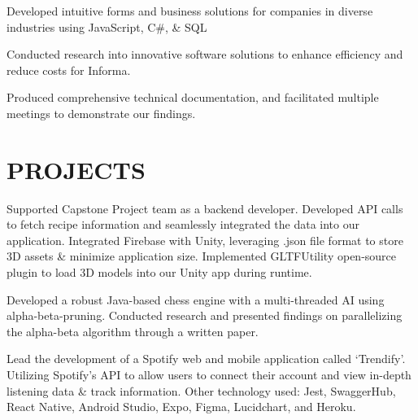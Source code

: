 \documentclass[]{deedy-resume-openfont}
\begin{document}
\begin{tightemize}
\item Developed intuitive forms and business solutions for companies in diverse industries using JavaScript, C\#, \& SQL 
\item Conducted research into innovative software solutions to enhance efficiency and reduce costs for Informa. 
\item Produced comprehensive technical documentation, and facilitated multiple meetings to demonstrate our findings.
\end{tightemize}


\section{PROJECTS}
\begin{tightemize}
\item Supported Capstone Project team as a backend developer. Developed API calls to fetch recipe information and seamlessly integrated the data into our application. Integrated Firebase with Unity, leveraging .json file format to store  3D assets \& minimize application size. Implemented  GLTFUtility open-source plugin to load 3D models into our Unity app during runtime.
\end{tightemize}
\sectionsep

\begin{tightemize}
\item Developed a robust Java-based chess engine with a multi-threaded AI using alpha-beta-pruning. 
Conducted research and presented findings on parallelizing the alpha-beta algorithm through a written paper.
\end{tightemize}
\sectionsep

\begin{tightemize}
\item Lead the development of a Spotify web and mobile application called ‘Trendify’. Utilizing Spotify’s API to allow users to connect their account and view in-depth listening data \& track information. Other technology used: Jest, SwaggerHub, React Native, Android Studio, Expo, Figma, Lucidchart, and Heroku.
\end{tightemize}
\end{document}
